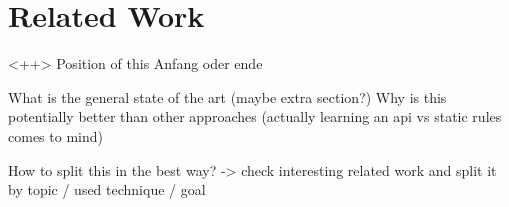 \chapter{Related Work}<++>
Position of this Anfang oder ende

What is the general state of the art (maybe extra section?)
Why is this potentially better than other approaches (actually learning an api vs static rules comes to mind)

How to split this in the best way?
-> check interesting related work and split it by topic / used technique / goal
